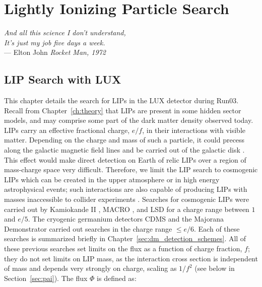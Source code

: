 \chapter{Lightly Ionizing Particle Search}

\label{ch:lips} %

\begin{flushright}{\slshape    
   And all this science I don't understand, \\
     It's just my job five days a week. } \\ \medskip
    --- {Elton John \textit{Rocket Man, 1972}}
\end{flushright}

\section{LIP Search with LUX}
This chapter details the search for \ac{LIP}s in the \ac{LUX} detector during Run03. Recall from Chapter~\ref{ch:theory} that \ac{LIP}s are present in some hidden sector models, and may comprise some part of the dark matter density observed today. \ac{LIP}s carry an effective fractional charge, $e/f$, in their interactions with visible matter. Depending on the charge and mass of such a particle, it could precess along the galactic magnetic field lines and be carried out of the galactic disk \cite{McDermott2011}. This effect would make direct detection on Earth of relic \ac{LIP}s over a region of mass-charge space very difficult. Therefore, we limit the \ac{LIP} search to cosmogenic \ac{LIP}s which can be created in the upper atmosphere or in high energy astrophysical events; such interactions are also capable of producing \ac{LIP}s with masses inaccessible to collider experiments \cite{Agnese2015}. Searches for cosmogenic \ac{LIP}s were carried out by Kamiokande II \cite{Mori1991}, MACRO \cite{Ambrosio2000} \cite{Ambrosio2004}, and LSD \cite{Aglietta1994} for a charge range between $1$ and $e/5$. The cryogenic germanium detectors CDMS \cite{Agnese2015} and the Majorana Demonstrator \cite{Alvis2018} carried out searches in the charge range $\leqslant e/6$. Each of these searches is summarized briefly in Chapter~\ref{sec:dm_detection_schemes}. All of these previous searches set limits on the flux as a function of charge fraction, $f$; they do not set limits on \ac{LIP} mass, as the interaction cross section is independent of mass and depends very strongly on charge, scaling as $1/f^{2}$ (see below in Section~\ref{sec:pai}). The flux $\Phi$ is defined as:

